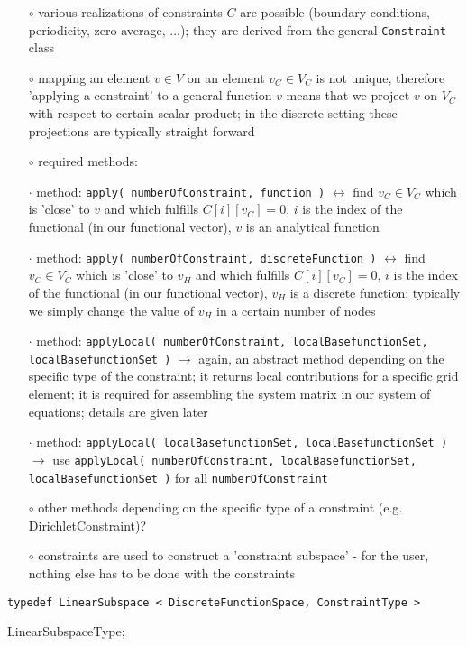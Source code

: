 \documentclass[a4paper,11pt]{article}
\numberwithin{equation}{section}
\begin{document}
\begin{itemize}
\item[$\circ$] various realizations of constraints $C$ are possible (boundary conditions, periodicity, zero-average, ...); they are derived from the general {\tt Constraint} class
\item[$\circ$] mapping an element $v\in V$ on an element $v_C \in V_C$ is not unique, therefore 'applying a constraint' to a general function $v$ means that we project $v$ on $V_C$ with respect to certain scalar product; in the discrete setting these projections are typically straight forward
\item[$\circ$] required methods:
\item[$\cdot$] method: {\tt apply( numberOfConstraint, function )} $\leftrightarrow$ find $v_C \in V_C$ which is 'close' to $v$ and which fulfills $C[i][v_C]=0$, $i$ is the index of the functional (in our functional vector), $v$ is an analytical function
\item[$\cdot$] method: {\tt apply( numberOfConstraint, discreteFunction )} $\leftrightarrow$ find $v_C \in V_C$ which is 'close' to $v_H$ and which fulfills $C[i][v_C]=0$, $i$ is the index of the functional (in our functional vector), $v_H$ is a discrete function; typically we simply change the value of $v_H$ in a certain number of nodes
\item[$\cdot$] method: {\tt applyLocal( numberOfConstraint, localBasefunctionSet, \\ localBasefunctionSet )} $\rightarrow$ again, an abstract method depending on the specific type of the constraint; it returns local contributions for a specific grid element; it is required for assembling the system matrix in our system of equations; details are given later
\item[$\cdot$] method: {\tt applyLocal( localBasefunctionSet, localBasefunctionSet )} $\rightarrow$ use {\tt applyLocal( numberOfConstraint, localBasefunctionSet, \\ localBasefunctionSet )} for all {\tt numberOfConstraint}
\item[$\circ$] other methods depending on the specific type of a constraint (e.g. DirichletConstraint)?
\item[$\circ$] constraints are used to construct a 'constraint subspace' - for the user, nothing else has to be done with the constraints
\end{itemize}
{\tt typedef LinearSubspace < DiscreteFunctionSpace, ConstraintType >

\hspace{1pt}LinearSubspaceType;}
\end{document}
